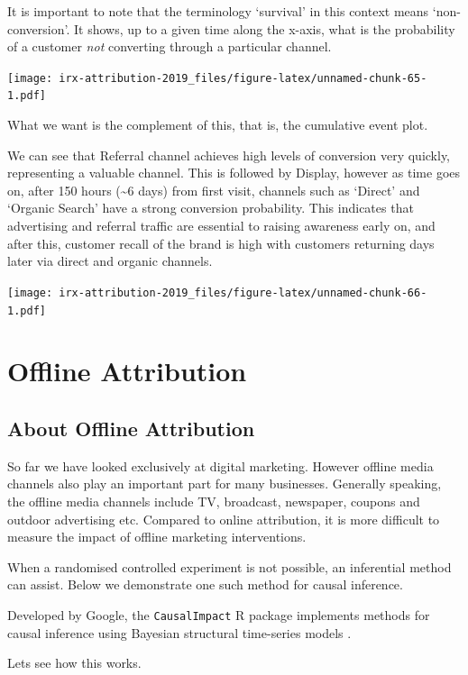 \documentclass[]{book}
\begin{document}
It is important to note that the terminology `survival' in this context
means `non-conversion'. It shows, up to a given time along the x-axis,
what is the probability of a customer \emph{not} converting through a
particular channel.

\texttt{[image: irx-attribution-2019\_files/figure-latex/unnamed-chunk-65-1.pdf]}

What we want is the complement of this, that is, the cumulative event
plot.

We can see that Referral channel achieves high levels of conversion very
quickly, representing a valuable channel. This is followed by Display,
however as time goes on, after 150 hours (\textasciitilde{}6 days) from
first visit, channels such as `Direct' and `Organic Search' have a
strong conversion probability. This indicates that advertising and
referral traffic are essential to raising awareness early on, and after
this, customer recall of the brand is high with customers returning days
later via direct and organic channels.

\texttt{[image: irx-attribution-2019\_files/figure-latex/unnamed-chunk-66-1.pdf]}

\part{Offline Attribution}\label{part-offline-attribution}

\chapter{About Offline Attribution}\label{about-offline-attribution}

So far we have looked exclusively at digital marketing. However offline
media channels also play an important part for many businesses.
Generally speaking, the offline media channels include TV, broadcast,
newspaper, coupons and outdoor advertising etc. Compared to online
attribution, it is more difficult to measure the impact of offline
marketing interventions.

When a randomised controlled experiment is not possible, an inferential
method can assist. Below we demonstrate one such method for causal
inference.

Developed by Google, the \texttt{CausalImpact} R package implements
methods for causal inference using Bayesian structural time-series
models \citep{causalimpact}.

Lets see how this works.
\end{document}
